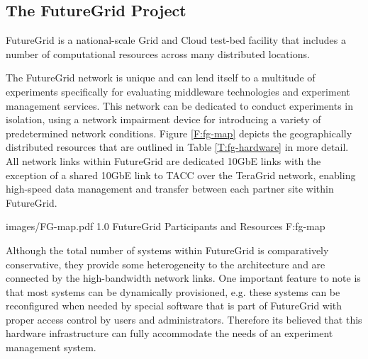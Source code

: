 \subsection{The FutureGrid Project}


FutureGrid is a national-scale Grid and Cloud test-bed facility that includes a number of computational resources across many distributed locations.   


The FutureGrid network is unique and can lend itself to a multitude of experiments specifically for evaluating middleware technologies and experiment management services.  This network can be dedicated to conduct experiments in isolation, using a network impairment device for introducing a variety of predetermined network conditions. Figure \ref{F:fg-map} depicts the geographically distributed resources that are outlined in Table \ref{T:fg-hardware} in more detail. All network links within FutureGrid are dedicated 10GbE links with the exception of a shared 10GbE link to TACC over the TeraGrid \cite{berman2001tkg, catlett2002philosophy} network, enabling high-speed data management and transfer between each partner site within FutureGrid.
   
  {images/FG-map.pdf}
  {1.0}
  {FutureGrid Participants and Resources}
  {F:fg-map}

Although the total number of systems within FutureGrid is comparatively conservative, they provide some heterogeneity to the architecture and are connected by the high-bandwidth network links. One important feature to note is that most systems can be dynamically provisioned, e.g. these systems can be reconfigured when needed by special software that is part of FutureGrid with proper access control by users and administrators.  Therefore its believed that this hardware infrastructure can fully accommodate the needs of an experiment management system.

